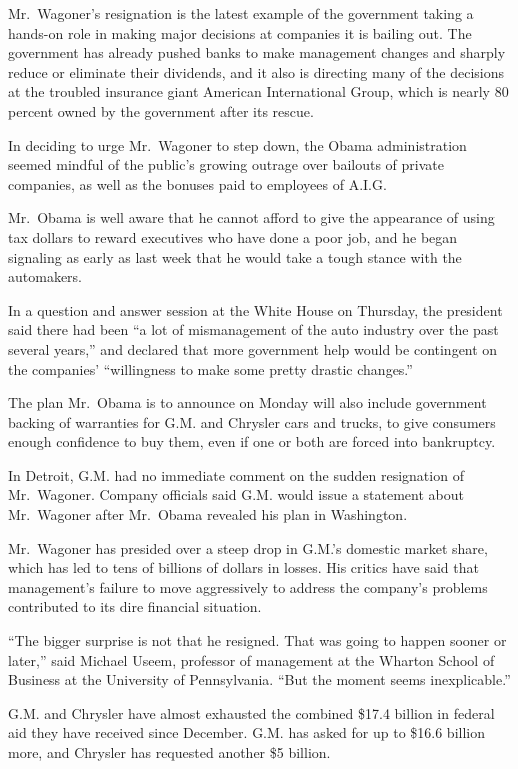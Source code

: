 \documentclass[12pt,a4paper,onecolumn]{article}
\begin{document}
Mr.~Wagoner's resignation is the latest example of the government taking a hands-on role in making
major decisions at companies it is bailing out. The government has already pushed banks to make
management changes and sharply reduce or eliminate their dividends, and it also is directing many of
the decisions at the troubled insurance giant American International Group, which is nearly 80
percent owned by the government after its rescue.

In deciding to urge Mr.~Wagoner to step down, the Obama administration seemed mindful of the
public's growing outrage over bailouts of private companies, as well as the bonuses paid to
employees of A.I.G.

Mr.~Obama is well aware that he cannot afford to give the appearance of using tax dollars to reward
executives who have done a poor job, and he began signaling as early as last week that he would take
a tough stance with the automakers.

In a question and answer session at the White House on Thursday, the president said there had been
``a lot of mismanagement of the auto industry over the past several years,'' and declared that more
government help would be contingent on the companies' ``willingness to make some pretty drastic
changes.''

The plan Mr.~Obama is to announce on Monday will also include government backing of warranties for
G.M. and Chrysler cars and trucks, to give consumers enough confidence to buy them, even if one or
both are forced into bankruptcy.

In Detroit, G.M. had no immediate comment on the sudden resignation of Mr.~Wagoner. Company
officials said G.M. would issue a statement about Mr.~Wagoner after Mr.~Obama revealed his plan in
Washington.

Mr.~Wagoner has presided over a steep drop in G.M.'s domestic market share, which has led to tens of
billions of dollars in losses. His critics have said that management's failure to move aggressively
to address the company's problems contributed to its dire financial situation.

``The bigger surprise is not that he resigned. That was going to happen sooner or later,'' said
Michael Useem, professor of management at the Wharton School of Business at the University of
Pennsylvania. ``But the moment seems inexplicable.''

G.M. and Chrysler have almost exhausted the combined \$17.4 billion in federal aid they have
received since December. G.M. has asked for up to \$16.6 billion more, and Chrysler has requested
another \$5 billion.
\end{document}
